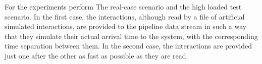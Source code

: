 For the experiments perform The real-case scenario and the high loaded test scenario. In the first case, the interactions, although read by a file of artificial simulated interactions, are provided to the pipeline data stream in such a way that they simulate their actual arrival time to the system, with the corresponding time separation between them. In the second case, the interactions are provided just one after the other as fast as possible as they are read.\\

